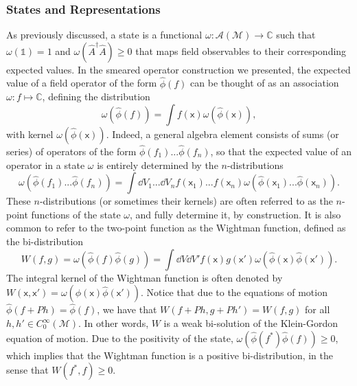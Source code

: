 \documentclass[letterpaper,12pt,titlepage,oneside,final]{book}
\newcommand{\openone}{\mathds{1}}
\newcommand{\M}{\mathcal{M}}
\newcommand{\mf}{\mathsf}%
\begin{document}
\subsubsection*{States and Representations}

As previously discussed, a state is a functional $\omega:\mathcal{A}(\M)\longrightarrow \mathbb{C}$ such that $\omega(\openone) = 1$ and $\omega(\hat{A}^\dagger\hat{A})\geq 0$ that maps field observables to their corresponding expected values. In the smeared operator construction we presented, the expected value of a field operator of the form $\hat{\phi}(f)$ can be thought of as an association $\omega:f\mapsto \mathbb{C}$, defining the distribution 
\begin{equation}
    \omega(\hat{\phi}(f)) = \int f(\mf x) \omega(\hat{\phi}(\mf x)),
\end{equation}
with kernel $\omega(\hat{\phi}(\mf x))$. Indeed, a general algebra element consists of sums (or series) of operators of the form $\hat{\phi}(f_1)...\hat{\phi}(f_n)$, so that the expected value of an operator in a state $\omega$ is entirely determined by the $n$-distributions
\begin{equation}
    \omega(\hat{\phi}(f_1)...\hat{\phi}(f_n)) = \int \dd V_1...\dd V_n f(\mf x_1)...f(\mf x_n) \omega(\hat{\phi}(\mf x_1)...\hat{\phi}(\mf x_n)).
\end{equation}
These $n$-distributions (or sometimes their kernels) are often referred to as the $n$-point functions of the state $\omega$, and fully determine it, by construction. It is also common to refer to the two-point function as the Wightman function, defined as the bi-distribution
\begin{equation}
    W(f,g) = \omega(\hat{\phi}(f)\hat{\phi}(g)) = \int \dd V \dd V' f(\mf x) g(\mf x')\omega(\hat{\phi}(\mf x)\hat{\phi}(\mf x')).
\end{equation}
The integral kernel of the Wightman function is often denoted by $W(\mf x, \mf x') = \omega(\hat{\phi}(\mf x)\hat{\phi}(\mf x'))$. Notice that due to the equations of motion $\hat{\phi}(f+Ph) = \hat{\phi}(f)$, we have that $W(f+Ph,g+Ph') = W(f,g)$ for all $h,h'\in C_0^\infty(\M)$. In other words, $W$ is a weak bi-solution of the Klein-Gordon equation of motion. Due to the positivity of the state, $\omega(\hat{\phi}(f^*)\hat{\phi}(f))\geq 0$, which implies that the Wightman function is a positive bi-distribution, in the sense that $W(f^*,f)\geq 0$. 
\end{document}
